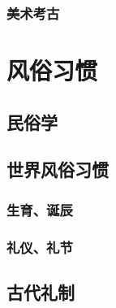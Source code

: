 \documentclass[UTF8]{../RepresentationUniverse}
\begin{document}
    \subsubsection{美术考古}

\section{风俗习惯}
    \subsection{民俗学}
    \subsection{世界风俗习惯}
        \subsubsection{生育、诞辰}
        \subsubsection{礼仪、礼节}
    \subsection{古代礼制}
\end{document}
